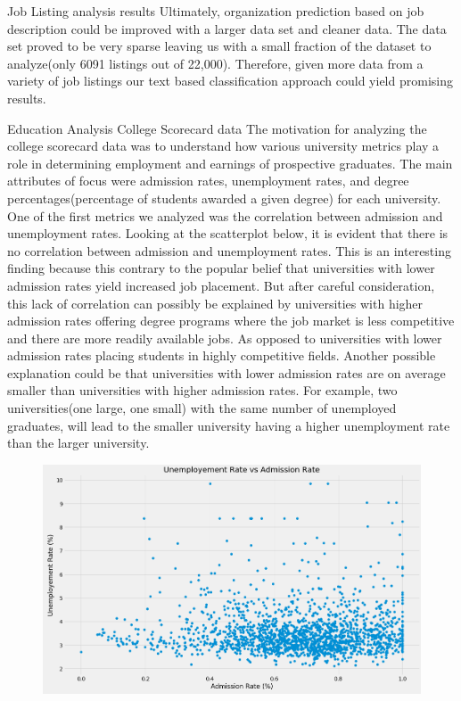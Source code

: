 Job Listing analysis results
Ultimately, organization prediction based on job description could be improved with a larger data set and cleaner data. The data set proved to be very sparse leaving us with a small fraction of the dataset to analyze(only 6091 listings out of 22,000). Therefore, given more data from a variety of job listings our text based classification approach could yield promising results.

Education Analysis
College Scorecard data
The motivation for analyzing the college scorecard data \cite{collegeScorecard} was to understand how various university metrics play a role in determining employment and earnings of prospective graduates. The main attributes of focus were admission rates, unemployment rates, and degree percentages(percentage of students awarded a given degree) for each university. One of the first metrics we analyzed was the correlation between admission and unemployment rates. Looking at the scatterplot below, it is evident that there is no correlation between admission and unemployment rates. This is an interesting finding because this contrary to the popular belief that universities with lower admission rates yield increased job placement. But after careful consideration, this lack of correlation can possibly be explained by universities with higher admission rates offering degree programs where the job market is less competitive and there are more readily available jobs. As opposed to universities with lower admission rates placing students in highly competitive fields. Another possible explanation could be that universities with lower admission rates are on average smaller than universities with higher admission rates. For example, two universities(one large, one small) with the same number of unemployed graduates, will lead to the smaller university having a higher unemployment rate than the larger university.
\begin{figure} 
	  \includegraphics[width=\textwidth]{images/adm_unem_rate_scatter.png}
	\label{fig:test4}
\end{figure}


